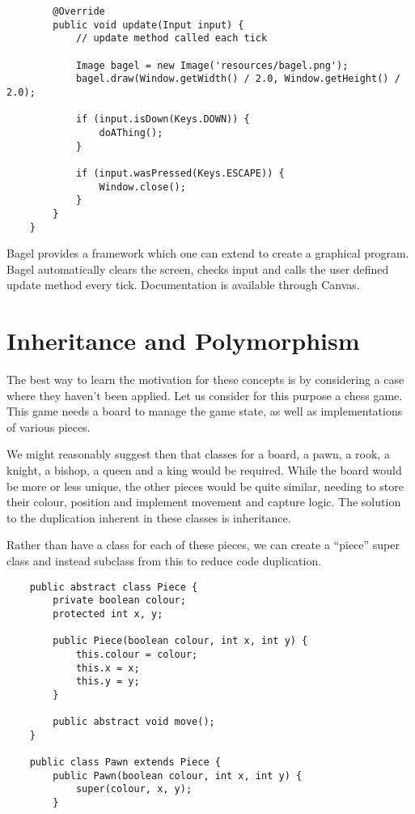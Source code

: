 \documentclass[12pt]{report}
\begin{document}
\begin{flushleft}
\begin{lstlisting}
        @Override
        public void update(Input input) {
            // update method called each tick
        
            Image bagel = new Image('resources/bagel.png');
            bagel.draw(Window.getWidth() / 2.0, Window.getHeight() / 2.0);

            if (input.isDown(Keys.DOWN)) {
                doAThing();
            }

            if (input.wasPressed(Keys.ESCAPE)) {
                Window.close();
            }
        }
    }
\end{lstlisting}

Bagel provides a framework which one can extend to create a graphical program.
Bagel automatically clears the screen, checks input and calls the user defined
update method every tick. Documentation is available through Canvas.

\section*{Inheritance and Polymorphism}

The best way to learn the motivation for these concepts is by considering a
case where they haven't been applied. Let us consider for this purpose a chess
game. This game needs a board to manage the game state, as well as
implementations of various pieces. \par
We might reasonably suggest then that classes for a board, a pawn, a rook, a
knight, a bishop, a queen and a king would be required. While the board would
be more or less unique, the other pieces would be quite similar, needing to
store their colour, position and implement movement and capture logic. The
solution to the duplication inherent in these classes is inheritance. \par
Rather than have a class for each of these pieces, we can create a ``piece''
super class and instead subclass from this to reduce code duplication.

\begin{lstlisting}
    public abstract class Piece {
        private boolean colour;
        protected int x, y;

        public Piece(boolean colour, int x, int y) {
            this.colour = colour;
            this.x = x;
            this.y = y;
        }

        public abstract void move();
    }

    public class Pawn extends Piece {
        public Pawn(boolean colour, int x, int y) {
            super(colour, x, y);
        }
    

\end{lstlisting}
\end{flushleft}
\end{document}
